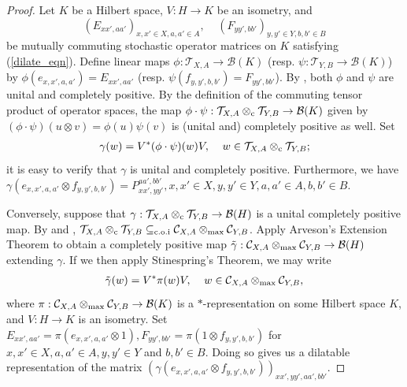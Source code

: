 \documentclass[11pt]{amsart}
\newcommand{\cl}[1]{\mathcal{#1}}
\begin{document}
\begin{proof}
Let $K$ be a Hilbert space, $V: H\rightarrow K$ be an isometry, and
$$ (E_{xx', aa'})_{x, x' \in X, a, a' \in A}, \;\;\;\; (F_{yy', bb'})_{y, y' \in Y, b, b' \in B}$$
be mutually commuting stochastic operator matrices on $K$ satisfying (\ref{dilate_eqn}). Define linear maps $\phi: \cl{T}_{X, A}\rightarrow \cl{B}(K)$ (resp. $\psi: \cl{T}_{Y, B}\rightarrow \cl{B}(K)$) by $\phi(e_{x, x', a, a'}) = E_{xx', aa'}$ (resp. $\psi(f_{y, y', b, b'}) = F_{yy', bb'}$). By \cite[Theorem 5.2]{tt}, both $\phi$ and $\psi$ are unital and completely positive. By the definition of the commuting tensor product of operator spaces, the map $\phi\cdot \psi: \cl{T}_{X, A}\otimes_{\rm c}\cl{T}_{Y, B}\rightarrow \cl{B}(K)$ given by $(\phi\cdot \psi)(u\otimes v) = \phi(u)\psi(v)$ is (unital and) completely positive as well. Set
\begin{gather*}
	\gamma(w) = V^{*}(\phi\cdot \psi)(w)V, \;\;\;\; w \in \cl{T}_{X, A}\otimes_{\rm c}\cl{T}_{Y, B};
\end{gather*}
\noindent it is easy to verify that $\gamma$ is unital and completely positive. Furthermore, we have $\gamma(e_{x, x', a, a'}\otimes f_{y, y', b, b'}) = P_{xx', yy'}^{aa', bb'}, x, x' \in X, y, y' \in Y, a, a' \in A, b, b' \in B$. 

Conversely, suppose that $\gamma: \cl{T}_{X, A}\otimes_{\rm c}\cl{T}_{Y, B}\rightarrow \cl{B}(H)$ is a unital completely positive map. By \cite[Corollary 5.3]{tt} and \cite[Theorem 6.4]{kptt}, $\cl{T}_{X, A}\otimes_{\rm c} \cl{T}_{Y, B} \subseteq_{\rm c.o.i} \cl{C}_{X, A}\otimes_{\rm max} \cl{C}_{Y, B}$. Apply Arveson's Extension Theorem to obtain a completely positive map $\tilde{\gamma}: \cl{C}_{X, A}\otimes_{\rm max}\cl{C}_{Y, B}\rightarrow \cl{B}(H)$ extending $\gamma$. If we then apply Stinespring's Theorem, we may write
\begin{gather*}
	\tilde{\gamma}(w) = V^{*}\pi(w)V, \;\;\;\; w \in \cl{C}_{X, A}\otimes_{\rm max} \cl{C}_{Y, B},
\end{gather*}
\noindent where $\pi: \cl{C}_{X, A}\otimes_{\rm max} \cl{C}_{Y, B}\rightarrow \cl{B}(K)$ is a $*$-representation on some Hilbert space $K$, and $V:H\rightarrow K$ is an isometry. Set $E_{xx', aa'} = \pi(e_{x, x', a, a'}\otimes 1), F_{yy', bb'} = \pi(1\otimes f_{y, y', b, b'})$ for $x, x' \in X, a, a' \in A, y, y' \in Y$ and $b, b' \in B$. Doing so gives us a dilatable representation of the matrix $(\gamma(e_{x, x', a, a'}\otimes f_{y, y', b, b'}))_{xx', yy', aa', bb'}$. 
\end{proof}
\end{document}
